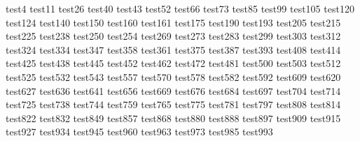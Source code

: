 \gls{test4}
\gls{test11}
\gls{test26}
\gls{test40}
\gls{test43}
\gls{test52}
\gls{test66}
\gls{test73}
\gls{test85}
\gls{test99}
\gls{test105}
\gls{test120}
\gls{test124}
\gls{test140}
\gls{test150}
\gls{test160}
\gls{test161}
\gls{test175}
\gls{test190}
\gls{test193}
\gls{test205}
\gls{test215}
\gls{test225}
\gls{test238}
\gls{test250}
\gls{test254}
\gls{test269}
\gls{test273}
\gls{test283}
\gls{test299}
\gls{test303}
\gls{test312}
\gls{test324}
\gls{test334}
\gls{test347}
\gls{test358}
\gls{test361}
\gls{test375}
\gls{test387}
\gls{test393}
\gls{test408}
\gls{test414}
\gls{test425}
\gls{test438}
\gls{test445}
\gls{test452}
\gls{test462}
\gls{test472}
\gls{test481}
\gls{test500}
\gls{test503}
\gls{test512}
\gls{test525}
\gls{test532}
\gls{test543}
\gls{test557}
\gls{test570}
\gls{test578}
\gls{test582}
\gls{test592}
\gls{test609}
\gls{test620}
\gls{test627}
\gls{test636}
\gls{test641}
\gls{test656}
\gls{test669}
\gls{test676}
\gls{test684}
\gls{test697}
\gls{test704}
\gls{test714}
\gls{test725}
\gls{test738}
\gls{test744}
\gls{test759}
\gls{test765}
\gls{test775}
\gls{test781}
\gls{test797}
\gls{test808}
\gls{test814}
\gls{test822}
\gls{test832}
\gls{test849}
\gls{test857}
\gls{test868}
\gls{test880}
\gls{test888}
\gls{test897}
\gls{test909}
\gls{test915}
\gls{test927}
\gls{test934}
\gls{test945}
\gls{test960}
\gls{test963}
\gls{test973}
\gls{test985}
\gls{test993}
